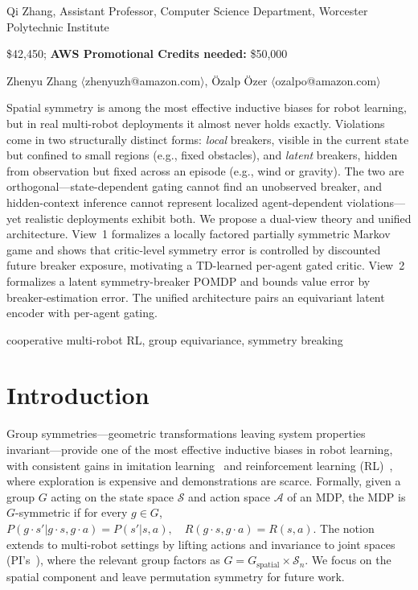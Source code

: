\documentclass[11pt]{article}
\begin{document}

 Qi Zhang, Assistant Professor, Computer Science Department, Worcester Polytechnic Institute

 \$42,450; \qquad
{\bf AWS Promotional Credits needed:} \$50,000

Zhenyu Zhang $\langle$zhenyuzh@amazon.com$\rangle$,
Özalp Özer $\langle$ozalpo@amazon.com$\rangle$

Spatial symmetry is among the most effective inductive biases for robot learning, but in real multi-robot deployments it almost never holds exactly. Violations come in two structurally distinct forms: \emph{local} breakers, visible in the current state but confined to small regions (e.g., fixed obstacles), and \emph{latent} breakers, hidden from observation but fixed across an episode (e.g., wind or gravity). The two are orthogonal—state-dependent gating cannot find an unobserved breaker, and hidden-context inference cannot represent localized agent-dependent violations—yet realistic deployments exhibit both. We propose a dual-view theory and unified architecture. View~1 formalizes a locally factored partially symmetric Markov game and shows that critic-level symmetry error is controlled by discounted future breaker exposure, motivating a TD-learned per-agent gated critic. View~2 formalizes a latent symmetry-breaker POMDP and bounds value error by breaker-estimation error. The unified architecture pairs an equivariant latent encoder with per-agent gating.

cooperative multi-robot RL, group equivariance, symmetry breaking


\section{Introduction}
Group symmetries—geometric transformations leaving system properties invariant—provide one of the most effective inductive biases in robot learning, with consistent gains in imitation learning~\citep{zeng2021transporter,wang2024equivariantdiffusion,seo2025survey} and reinforcement learning (RL)~\citep{vanderpol2020mdp,wang2022so2,luo2024reinforcement}, where exploration is expensive and demonstrations are scarce.
Formally, given a group $G$ acting on the state space $\mathcal{S}$ and action space $\mathcal{A}$ of an MDP, the MDP is $G$-symmetric if for every $g\in G$,
$
P(g \cdot s' | g \cdot s, g \cdot a) = P(s' | s, a), \quad R(g \cdot s, g \cdot a) = R(s, a)
$.
The notion extends to multi-robot settings by lifting actions and invariance to joint spaces (PI's~\citep{chen20243}), where the relevant group factors as $G = G_{\text{spatial}} \times \mathcal{S}_n$. We focus on the spatial component and leave permutation symmetry for future work.
\end{document}
